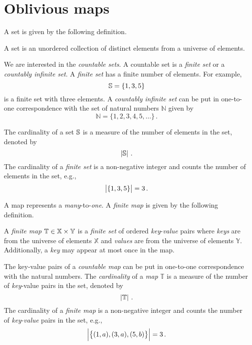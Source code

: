 \documentclass[ ../main.tex]{subfiles}
\begin{document}
\section{Oblivious maps}
\label{sec:map}
A set is given by the following definition.
\begin{definition}
A set is an unordered collection of distinct elements from a universe of elements.
\end{definition}
We are interested in the \emph{countable sets}. A countable set is a \emph{finite set} or a \emph{countably infinite set}. A \emph{finite set} has a finite number of elements. For example,
\[
    \mathbb{S} = \{ 1, 3, 5 \}
\]
is a finite set with three elements. A \emph{countably infinite set} can be put in one-to-one correspondence with the set of natural numbers $\mathbb{N}$ given by
\begin{equation}
    \mathbb{N} = \{1,2,3,4,5,\ldots\}\,.
\end{equation}

The cardinality of a set $\mathbb{S}$ is a measure of the number of elements in the set, denoted by
\begin{equation}
    \left\vert{\mathbb{\mathbb{S}}}\right\vert\,.
\end{equation}
The cardinality of a \emph{finite set} is a non-negative integer and counts the number of elements in the set, e.g.,
\[
    \left\vert{\left\{ 1, 3, 5\right\}}\right\vert = 3\,.
\]

A map represents a \emph{many}-to-\emph{one}. A \emph{finite map} is given by the following definition.
\begin{definition}
A \emph{finite map} $\mathbb{T} \in \mathbb{X} \times \mathbb{Y}$ is a \emph{finite set} of ordered \emph{key}-\emph{value} pairs where \emph{keys} are from the universe of elements $\mathbb{X}$ and \emph{values} are from the universe of elements $\mathbb{Y}$. Additionally, a \emph{key} may appear at most once in the map.
\end{definition}

The key-value pairs of a \emph{countable map} can be put in one-to-one correspondence with the natural numbers. The \emph{cardinality} of a \emph{map} $\mathbb{T}$ is a measure of the number of \emph{key}-{value} pairs in the set, denoted by
\begin{equation}
    \left\vert{\mathbb{T}}\right\vert\,.
\end{equation}
The cardinality of a \emph{finite map} is a non-negative integer and counts the number of \emph{key}-\emph{value} pairs in the set, e.g.,
\[
    \left\vert{\left\{ (1, a), (3, a), (5, b) \right\}}\right\vert = 3\,.
\]
\end{document}
